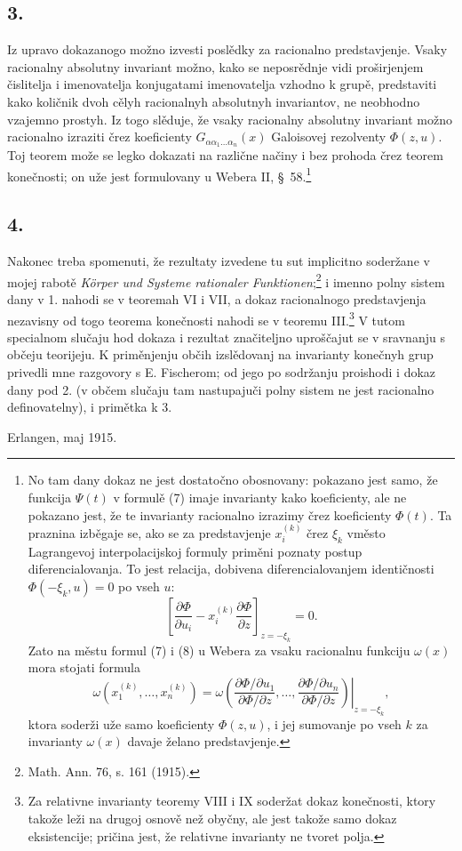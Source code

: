 \documentclass[11pt]{article}
\begin{document}
\subsection*{3.}
Iz upravo dokazanogo možno izvesti poslědky za racionalno predstavjenje. Vsaky racionalny absolutny invariant možno, kako se neposrědnje vidi proširjenjem čislitelja i imenovatelja konjugatami imenovatelja vzhodno k grupě, predstaviti kako količnik dvoh cělyh racionalnyh absolutnyh invariantov, ne neobhodno vzajemno prostyh. Iz togo slěduje, že vsaky racionalny absolutny invariant možno racionalno izraziti črez koeficienty $G_{\alpha\alpha_1\ldots\alpha_n}(x)$ Galoisovej rezolventy $\Phi(z,u)$. Toj teorem može se legko dokazati na različne načiny i bez prohoda črez teorem konečnosti; on uže jest formulovany u Webera II, \S\ 58.\footnote{No tam dany dokaz ne jest dostatočno obosnovany: pokazano jest samo, že funkcija $\Psi(t)$ v formulě (7) imaje invarianty kako koeficienty, ale ne pokazano jest, že te invarianty racionalno izrazimy črez koeficienty $\Phi(t)$. Ta praznina izběgaje se, ako se za predstavjenje $x_i^{(k)}$ črez $\xi_k$ vměsto Lagrangevoj interpolacijskoj formuly priměni poznaty postup diferencialovanja. To jest relacija, dobivena diferencialovanjem identičnosti $\Phi(-\xi_k,u)=0$ po vseh $u$:
\[
 \left[\frac{\partial\Phi}{\partial u_i}
      -x_i^{(k)}\frac{\partial\Phi}{\partial z}\right]_{z=-\xi_k}=0.
\]
Zato na městu formul (7) i (8) u Webera za vsaku racionalnu funkciju $\omega(x)$ mora stojati formula
\[
 \omega(x_1^{(k)},\ldots,x_n^{(k)})=
 \left.
 \omega\!\left(
   \frac{\partial\Phi/\partial u_1}{\partial\Phi/\partial z},\ldots,
   \frac{\partial\Phi/\partial u_n}{\partial\Phi/\partial z}
 \right)\right|_{z=-\xi_k},
\]
ktora soderži uže samo koeficienty $\Phi(z,u)$, i jej sumovanje po vseh $k$ za invarianty $\omega(x)$ davaje želano predstavjenje.}

\subsection*{4.}
Nakonec treba spomenuti, že rezultaty izvedene tu sut implicitno soderžane v mojej rabotě \emph{Körper und Systeme rationaler Funktionen};\footnote{Math. Ann. 76, s. 161 (1915).} i imenno polny sistem dany v 1. nahodi se v teoremah VI i VII, a dokaz racionalnogo predstavjenja nezavisny od togo teorema konečnosti nahodi se v teoremu III.\footnote{Za relativne invarianty teoremy VIII i IX soderžat dokaz konečnosti, ktory takože leži na drugoj osnově než obyčny, ale jest takože samo dokaz eksistencije; pričina jest, že relativne invarianty ne tvoret polja.} V tutom specialnom slučaju hod dokaza i rezultat značiteljno uproščajut se v sravnanju s občeju teorijeju. K priměnjenju občih izslědovanj na invarianty konečnyh grup privedli mne razgovory s E. Fischerom; od jego po sodržanju proishodi i dokaz dany pod 2. (v občem slučaju tam nastupajuči polny sistem ne jest racionalno definovatelny), i primětka k 3.

Erlangen, maj 1915.
\end{document}
